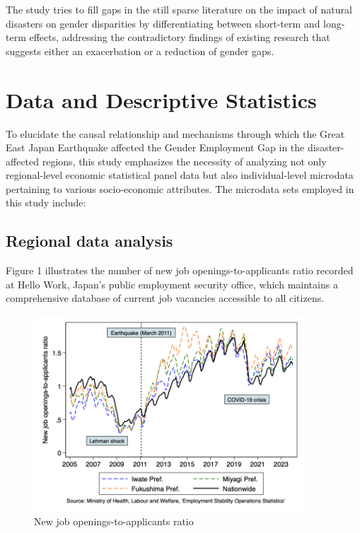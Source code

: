 \documentclass[12pt,halfline,a4paper]{ouparticle}
\begin{document}
The study tries to fill gaps in the still sparse literature on the impact of natural disasters on gender disparities by differentiating between short-term and long-term effects, addressing the contradictory findings of existing research that suggests either an exacerbation or a reduction of gender gaps.



\section{Data and Descriptive Statistics}
\label{sec4}

To elucidate the causal relationship and mechanisms through which the Great East Japan Earthquake affected the Gender Employment Gap in the disaster-affected regions, this study emphasizes the necessity of analyzing not only regional-level economic statistical panel data but also individual-level microdata pertaining to various socio-economic attributes. The microdata sets employed in this study include:

\subsection{Regional data analysis}
\label{sec4.1}

Figure 1 illustrates the number of new job openings-to-applicants ratio recorded at Hello Work, Japan’s public employment security office, which maintains a comprehensive database of current job vacancies accessible to all citizens. 

\begin{figure}[h!]
    \centering
    \includegraphics[width=0.9\textwidth]{New job openings-to-applicants ratio.png}  %
    \caption{New job openings-to-applicants ratio}
    \label{fig:new_job_openings}
\end{figure}
\end{document}
